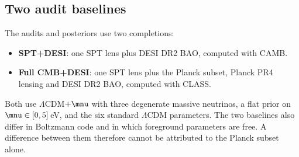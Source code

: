 \subsection{Two audit baselines}
The audits and posteriors use two completions:
\begin{itemize}[leftmargin=*, itemsep=2pt]
  \item \textbf{SPT+DESI}: one SPT lens plus DESI DR2 BAO, computed with CAMB.
  \item \textbf{Full CMB+DESI}: one SPT lens plus the Planck subset, Planck PR4 lensing and DESI DR2 BAO, computed with CLASS.
\end{itemize}
Both use $\Lambda$CDM$+\mnu$ with three degenerate massive neutrinos, a flat prior on $\mnu\in[0,5]$\,eV, and the six standard $\Lambda$CDM parameters. The two baselines also differ in Boltzmann code and in which foreground parameters are free. A difference between them therefore cannot be attributed to the Planck subset alone.
